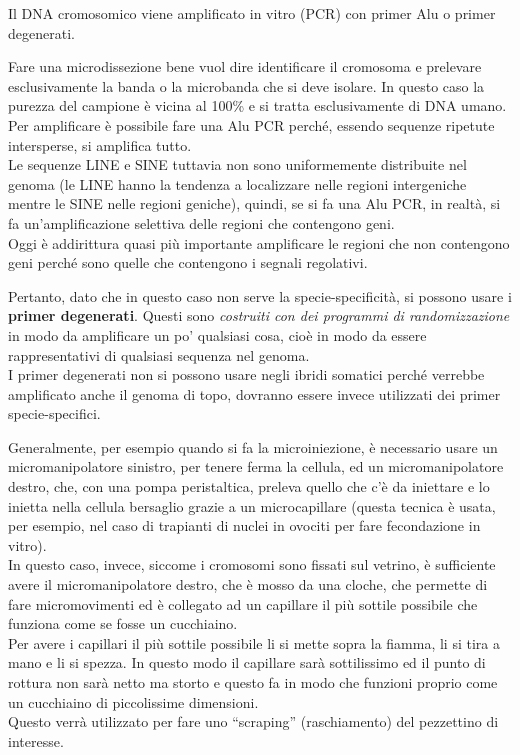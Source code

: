 \documentclass[11pt]{book}
\begin{document}
Il DNA cromosomico viene amplificato in vitro (PCR) con primer Alu o primer degenerati.

Fare una microdissezione bene vuol dire identificare il cromosoma e prelevare esclusivamente la banda o la microbanda che si deve isolare. In questo caso la purezza del campione è vicina al 100\% e si tratta esclusivamente di DNA umano.\\
Per amplificare è possibile fare una Alu PCR perché, essendo sequenze ripetute intersperse, si amplifica tutto.\\
Le sequenze LINE e SINE tuttavia non sono uniformemente distribuite nel genoma (le LINE hanno la tendenza a localizzare nelle regioni intergeniche mentre le SINE nelle regioni geniche), quindi, se si fa una Alu PCR, in realtà, si fa un’amplificazione selettiva delle regioni che contengono geni.\\
Oggi è addirittura quasi più importante amplificare le regioni che non contengono geni perché sono quelle che contengono i segnali regolativi.

Pertanto, dato che in questo caso non serve la specie-specificità, si possono usare i \textbf{primer degenerati}.
Questi sono \emph{costruiti con dei programmi di randomizzazione} in modo da amplificare un po’ qualsiasi cosa, cioè in modo da essere rappresentativi di qualsiasi sequenza nel genoma.\\
I primer degenerati non si possono usare negli ibridi somatici perché verrebbe amplificato anche il genoma di topo, dovranno essere invece utilizzati dei primer specie-specifici.

Generalmente, per esempio quando si fa la microiniezione, è necessario usare un micromanipolatore sinistro, per tenere ferma la cellula, ed un micromanipolatore destro, che, con una pompa peristaltica, preleva quello che c’è da iniettare e lo inietta nella cellula bersaglio grazie a un microcapillare (questa tecnica è usata, per esempio, nel caso di  trapianti di nuclei in ovociti per fare fecondazione in vitro).\\
In questo caso, invece, siccome i cromosomi sono fissati sul vetrino, è sufficiente avere il micromanipolatore destro, che è mosso da una cloche, che permette di fare micromovimenti ed è collegato ad un capillare il più sottile possibile che funziona come se fosse un cucchiaino.\\
Per avere i capillari il più sottile possibile li si mette sopra la fiamma, li si tira a mano e li si spezza.
In questo modo il capillare sarà sottilissimo ed il punto di rottura non sarà netto ma storto e questo fa in modo che funzioni proprio come un cucchiaino di piccolissime dimensioni.\\
Questo verrà utilizzato per fare uno ``scraping'' (raschiamento) del pezzettino di interesse.
\end{document}
